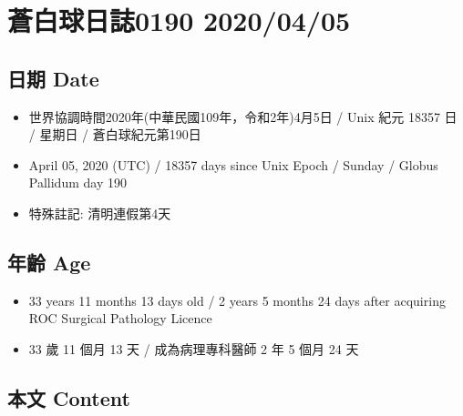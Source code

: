 \documentclass[a5paper, 11pt
]{book}
\providecommand{\tightlist}{%
  \setlength{\itemsep}{0pt}\setlength{\parskip}{0pt}}
\begin{document}
\hypertarget{ux84bcux767dux7403ux65e5ux8a8c0190-20200405}{%
\section{蒼白球日誌0190
2020/04/05}\label{ux84bcux767dux7403ux65e5ux8a8c0190-20200405}}

\hypertarget{ux65e5ux671f-date-35}{%
\subsection{日期 Date}\label{ux65e5ux671f-date-35}}

\begin{itemize}
\tightlist
\item
  世界協調時間2020年(中華民國109年，令和2年)4月5日 / Unix 紀元 18357 日
  / 星期日 / 蒼白球紀元第190日
\item
  April 05, 2020 (UTC) / 18357 days since Unix Epoch / Sunday / Globus
  Pallidum day 190
\item
  特殊註記: 清明連假第4天
\end{itemize}

\hypertarget{ux5e74ux9f61-age-35}{%
\subsection{年齡 Age}\label{ux5e74ux9f61-age-35}}

\begin{itemize}
\tightlist
\item
  33 years 11 months 13 days old / 2 years 5 months 24 days after
  acquiring ROC Surgical Pathology Licence
\item
  33 歲 11 個月 13 天 / 成為病理專科醫師 2 年 5 個月 24 天
\end{itemize}

\hypertarget{ux672cux6587-content-35}{%
\subsection{本文 Content}\label{ux672cux6587-content-35}}
\end{document}
